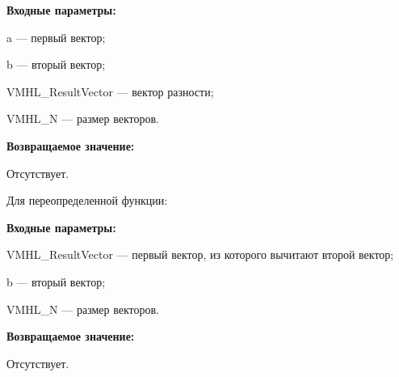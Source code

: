 \textbf{Входные параметры:}

  a --- первый вектор;
  
 b --- вторый вектор;
 
 VMHL\_ResultVector --- вектор разности;
 
 VMHL\_N --- размер векторов.

\textbf{Возвращаемое значение:}

Отсутствует.

Для переопределенной функции:

\textbf{Входные параметры:}

 VMHL\_ResultVector --- первый вектор, из которого вычитают второй вектор;
  
 b --- вторый вектор;
 
 VMHL\_N --- размер векторов.

\textbf{Возвращаемое значение:}

Отсутствует.